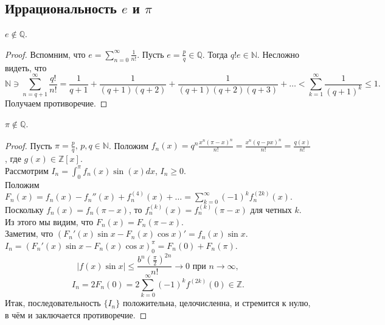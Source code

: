 \subsection{Иррациональность $e$ и $\pi$}
\begin{theorem} \label{l9_thm_e_irr}
	$e \not\in \mathbb{Q}$.
\end{theorem}
\begin{proof}
	Вспомним, что $\displaystyle e = \sum_{n=0}^{\infty} \frac{1}{n!}$. Пусть $e = \frac{p}{q} \in \mathbb{Q}$. Тогда $q! e \in \mathbb{N}$. Несложно видеть, что 
	$$\mathbb{N} \ni \sum_{n = q + 1}^{\infty} \frac{q!}{n!} = \frac{1}{q + 1} + \frac{1}{(q + 1)(q+2)} + \frac{1}{(q+1)(q+2)(q+3)} + \ldots < \sum_{k = 1}^{\infty} \frac{1}{(q+1)^k} \leq 1.$$
	Получаем противоречие.
\end{proof}

\begin{theorem} \label{l9_thm_pi_irr}
	$\pi \not \in \mathbb{Q}$.
\end{theorem}
\begin{proof}
	Пусть $\pi = \frac{p}{q}, \, p,q \in \mathbb{N}$. 
	Положим $\displaystyle f_n(x) = q^n \frac{x^n (\pi - x)^n}{n!} = \frac{x^n (q - px)^n}{n!} = \frac{q(x)}{n!}$, где $g(x) \in \mathbb{Z}[x]$.\\
	Рассмотрим $\displaystyle I_n = \int_{0}^{\pi} f_n(x) \sin(x) dx$, $I_n \geq 0$.\\
	Положим $\displaystyle F_n(x) = f_n(x) - f_n''(x) + f_n^{(4)}(x) + \ldots = \sum_{k = 0}^{\infty} (-1)^k f_n^{(2k)}(x)$.\\
	Поскольку $f_n(x) = f_n(\pi - x)$, то $f_n^{(k)}(x) = f_n^{(k)}(\pi - x)$ для четных $k$. Из этого мы видим, что $F_n(x) = F_n(\pi - x)$.\\
	Заметим, что $\left( F_n'(x) \sin x - F_n(x) \cos x\right)' = f_n(x) \sin x$.\\
	$I_n = \left(F_n'(x) \sin x - F_n(x) \cos x \right)_{0}^{\pi} = F_n(0) + F_n(\pi)$.\\
	$$|f(x) \sin x| \leq \frac{b^n \left( \frac{\pi}{2}\right)^{2n}}{n!} \rightarrow 0 \text{ при } n \rightarrow \infty,$$
	$$I_n = 2F_n(0) = 2 \sum_{k=0}^{\infty} (-1)^kf^{(2k)}(0) \in \mathbb{Z}.$$
	Итак, последовательность $\lbrace I_n \rbrace$ положительна, целочисленна, и стремится к нулю, в чём и заключается противоречие.
\end{proof}